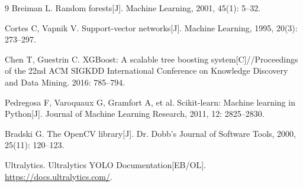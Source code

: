 \documentclass[withoutpreface,bwprint]{cumcmthesis}
\begin{document}
\begin{thebibliography}{9}
Breiman L. Random forests[J]. Machine Learning, 2001, 45(1): 5--32.

Cortes C, Vapnik V. Support-vector networks[J]. Machine Learning, 1995, 20(3): 273--297.

Chen T, Guestrin C. XGBoost: A scalable tree boosting system[C]//Proceedings of the 22nd ACM SIGKDD International Conference on Knowledge Discovery and Data Mining. 2016: 785--794.

Pedregosa F, Varoquaux G, Gramfort A, et al. Scikit-learn: Machine learning in Python[J]. Journal of Machine Learning Research, 2011, 12: 2825--2830.

Bradski G. The OpenCV library[J]. Dr. Dobb's Journal of Software Tools, 2000, 25(11): 120--123.

Ultralytics. Ultralytics YOLO Documentation[EB/OL]. \url{https://docs.ultralytics.com/}.
\end{thebibliography}
\end{document}
